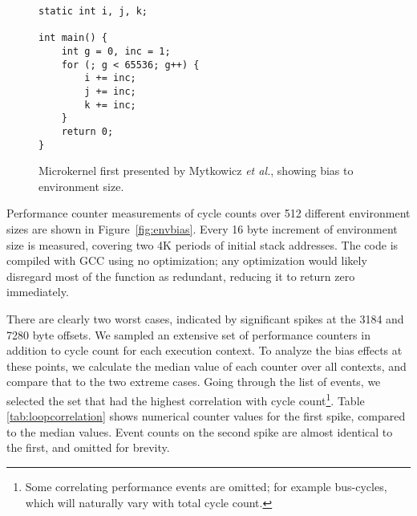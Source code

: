 \documentclass[10pt, conference, compsocconf]{IEEEtran}
\begin{document}
\begin{figure}[t]
  \begin{lstlisting}[frame=single, xleftmargin=.01\textwidth, xrightmargin=.01\textwidth]
static int i, j, k;

int main() {
    int g = 0, inc = 1;
    for (; g < 65536; g++) {
        i += inc;
        j += inc;
        k += inc;
    }
    return 0;
}
  \end{lstlisting}
  \caption{\label{fig:microkernel}Microkernel first presented by Mytkowicz \emph{et al.}\cite{Mytkowicz:2009:WrongData}, showing bias to environment size.}
\end{figure}

\begin{figure*}[t]
  \caption{Bias from environment size for microkernel. Measured average of 10 cycle count samples for 512 different environments. Spikes show aliasing case, occurring once for each 4K period.}
  \label{fig:envbias}
\end{figure*}

Performance counter measurements of cycle counts over 512 different environment sizes are shown in Figure~\ref{fig:envbias}.
Every 16 byte increment of environment size is measured, covering two 4K periods of initial stack addresses.
The code is compiled with {\small{GCC}} using no optimization; any optimization would likely disregard most of the function as redundant, reducing it to return zero immediately.

There are clearly two worst cases, indicated by significant spikes at the 3184 and 7280 byte offsets.
We sampled an extensive set of performance counters in addition to cycle count for each execution context.
To analyze the bias effects at these points, we calculate the median value of each counter over all contexts, and compare that to the two extreme cases.
Going through the list of events, we selected the set that had the highest correlation with cycle count\footnote{Some correlating performance events are omitted; for example bus-cycles, which will naturally vary with total cycle count.}.
Table \ref{tab:loopcorrelation} shows numerical counter values for the first spike, compared to the median values. Event counts on the second spike are almost identical to the first, and omitted for brevity.
\end{document}
